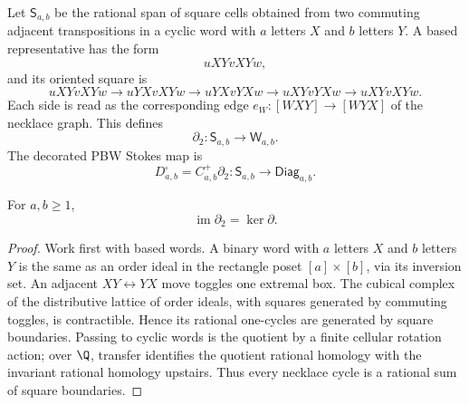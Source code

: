\begin{defn}
\label{def:app-square-cell-pbw-stokes-complex}
  Let \(\mathsf S_{a,b}\) be the rational span of square cells obtained
  from two commuting adjacent transpositions in a cyclic word with \(a\) letters
  \(X\) and \(b\) letters \(Y\).  A based representative has the form
  \[
    uXYvXYw,
  \]
  and its oriented square is
  \[
    uXYvXYw\to uYXvXYw\to uYXvYXw\to
    uXYvYXw\to uXYvXYw .
  \]
  Each side is read as the corresponding edge
  \(e_W:[WXY]\to[WYX]\) of the necklace graph.  This defines
  \[
    \partial_2\colon \mathsf S_{a,b}\longrightarrow\mathsf W_{a,b}.
  \]
  The decorated PBW Stokes map is
  \[
    D^\square_{a,b}
      =
      C^+_{a,b}\partial_2\colon
      \mathsf S_{a,b}\longrightarrow\mathsf{Diag}_{a,b}.
  \]
\end{defn}

\begin{lem}
\label{lem:app-ordinary-necklace-stokes}
  For \(a,b\geq1\),
  \[
    \operatorname{im}\partial_2=\ker\partial .
  \]
\end{lem}

\begin{proof}
  Work first with based words.  A binary word with \(a\) letters \(X\)
  and \(b\) letters \(Y\) is the same as an order ideal in the rectangle
  poset \([a]\times[b]\), via its inversion set.  An adjacent
  \(XY\leftrightarrow YX\) move toggles one extremal box.  The cubical
  complex of the distributive lattice of order ideals, with squares
  generated by commuting toggles, is contractible.  Hence its rational
  one-cycles are generated by square boundaries.  Passing to cyclic words
  is the quotient by a finite cellular rotation action; over \(\Q\),
  transfer identifies the quotient rational homology with the invariant
  rational homology upstairs.  Thus every necklace cycle is a rational
  sum of square boundaries.
\end{proof}

